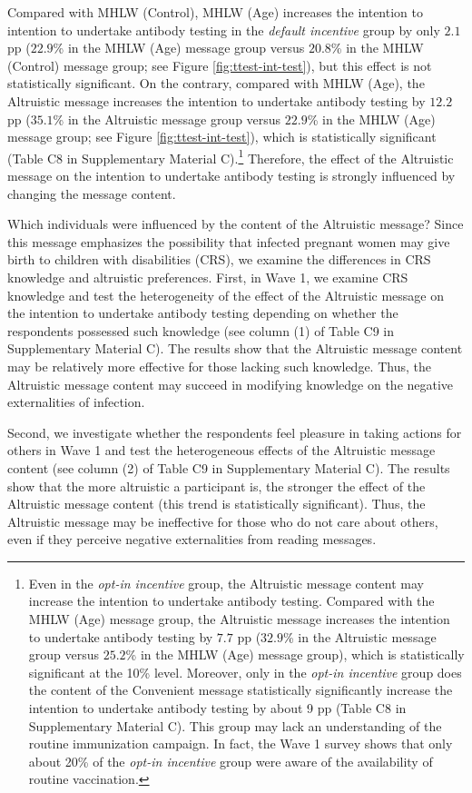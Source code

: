 \documentclass[
      12pt,
    a4paper
]{article}
\begin{document}
Compared with MHLW (Control), MHLW (Age) increases the intention to intention to undertake antibody testing in the \emph{default incentive} group by only \(2.1\) pp (\(22.9\)\% in the MHLW (Age) message group versus \(20.8\)\% in the MHLW (Control) message group; see Figure \ref{fig:ttest-int-test}), but this effect is not statistically significant. On the contrary, compared with MHLW (Age), the Altruistic message increases the intention to undertake antibody testing by \(12.2\) pp (\(35.1\)\% in the Altruistic message group versus \(22.9\)\% in the MHLW (Age) message group; see Figure \ref{fig:ttest-int-test}), which is statistically significant (Table C8 in Supplementary Material C).\footnote{Even in the \emph{opt-in incentive} group, the Altruistic message content may increase the intention to undertake antibody testing. Compared with the MHLW (Age) message group, the Altruistic message increases the intention to undertake antibody testing by \(7.7\) pp (\(32.9\)\% in the Altruistic message group versus \(25.2\)\% in the MHLW (Age) message group), which is statistically significant at the 10\% level. Moreover, only in the \emph{opt-in incentive} group does the content of the Convenient message statistically significantly increase the intention to undertake antibody testing by about 9 pp (Table C8 in Supplementary Material C). This group may lack an understanding of the routine immunization campaign. In fact, the Wave 1 survey shows that only about 20\% of the \emph{opt-in incentive} group were aware of the availability of routine vaccination.} Therefore, the effect of the Altruistic message on the intention to undertake antibody testing is strongly influenced by changing the message content.

Which individuals were influenced by the content of the Altruistic message? Since this message emphasizes the possibility that infected pregnant women may give birth to children with disabilities (CRS), we examine the differences in CRS knowledge and altruistic preferences. First, in Wave 1, we examine CRS knowledge and test the heterogeneity of the effect of the Altruistic message on the intention to undertake antibody testing depending on whether the respondents possessed such knowledge (see column (1) of Table C9 in Supplementary Material C). The results show that the Altruistic message content may be relatively more effective for those lacking such knowledge. Thus, the Altruistic message content may succeed in modifying knowledge on the negative externalities of infection.

Second, we investigate whether the respondents feel pleasure in taking actions for others in Wave 1 and test the heterogeneous effects of the Altruistic message content (see column (2) of Table C9 in Supplementary Material C). The results show that the more altruistic a participant is, the stronger the effect of the Altruistic message content (this trend is statistically significant). Thus, the Altruistic message may be ineffective for those who do not care about others, even if they perceive negative externalities from reading messages.
\end{document}
